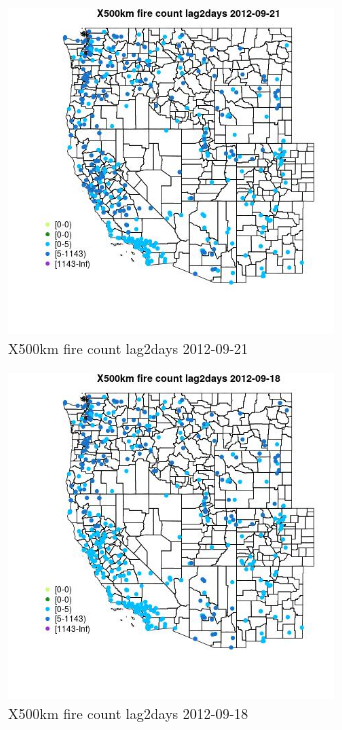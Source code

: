 \begin{figure} 
\centering  
\includegraphics[width=0.77\textwidth]{Code_Outputs/Report_ML_input_PM25_Step4_part_e_de_duplicated_aves_compiled_2019-05-14wNAs_MapObsX500km_fire_count_lag2days2012-09-21.jpg} 
\caption{\label{fig:Report_ML_input_PM25_Step4_part_e_de_duplicated_aves_compiled_2019-05-14wNAsMapObsX500km_fire_count_lag2days2012-09-21}X500km fire count lag2days 2012-09-21} 
\end{figure} 
 

\clearpage 

\begin{figure} 
\centering  
\includegraphics[width=0.77\textwidth]{Code_Outputs/Report_ML_input_PM25_Step4_part_e_de_duplicated_aves_compiled_2019-05-14wNAs_MapObsX500km_fire_count_lag2days2012-09-18.jpg} 
\caption{\label{fig:Report_ML_input_PM25_Step4_part_e_de_duplicated_aves_compiled_2019-05-14wNAsMapObsX500km_fire_count_lag2days2012-09-18}X500km fire count lag2days 2012-09-18} 
\end{figure} 
 

